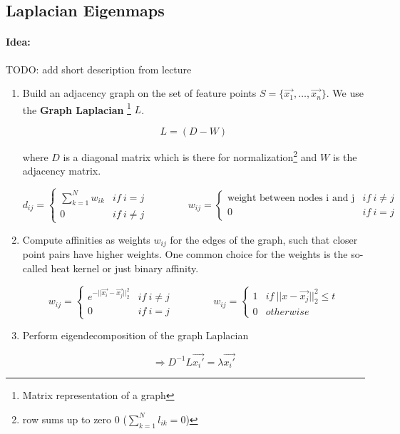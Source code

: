 
\subsection*{Laplacian Eigenmaps}

\paragraph{Idea:} TODO: add short description from lecture
\begin{enumerate}
    \item Build an adjacency graph on the set of feature points \(S=\{\vec{x_1}, \dots, \vec{x_n}\}\). We use the \textbf{Graph Laplacian} \footnote{Matrix representation of a graph} $L$.

      \[L = (D - W)\]

      where \(D\) is a diagonal matrix which is there for normalization\footnote{row sums up to zero \(0\) (\(\sum_{k=1}^N l_{ik} = 0\))} and \(W\) is the adjacency matrix.

      \[d_{ij} = \begin{cases} \sum_{k=1}^N w_{ik} & if \ i=j \\ 0 & if \ i \neq j \end{cases}
        \qquad \qquad w_{ij} = \begin{cases} \text{weight between nodes i and j} & if \ i\neq j \\ 0 & if \ i = j\end{cases}\]

    \item Compute affinities as weights \(w_{ij}\) for the edges of the graph, such that closer point pairs have higher weights. One common choice for the weights is the so-called heat kernel or just binary affinity.

      \[w_{ij} = \begin{cases} e^{-||\vec{x_i} - \vec{x_j}||_2^2}  & if \ i\neq j \\ 0 & if \ i = j\end{cases}
        \qquad \qquad w_{ij} = \begin{cases} 1 & if \ ||x-\vec{x_j}||_2^2 \leq t \\ 0 & otherwise \end{cases}\]

    \item Perform eigendecomposition of the graph Laplacian

      \[\Rightarrow \boxed{D^{-1} L \vec{x_i'} = \lambda \vec{x_i'}}\]


\end{enumerate}
